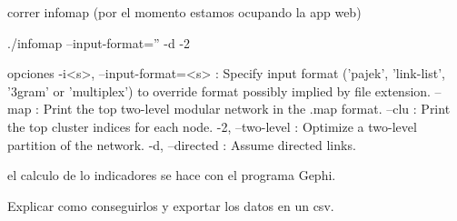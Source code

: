 \documentclass[12pt]{article}
\begin{document}
        
    correr infomap (por el momento estamos ocupando la app web)
    
    ./infomap --input-format='' -d -2
    
    opciones
    -i<s>, --input-format=<s> : Specify input format ('pajek', 'link-list', '3gram' or 'multiplex') to override format possibly implied by file extension.
    --map : Print the top two-level modular network in the .map format.
    --clu : Print the top cluster indices for each node.
    -2, --two-level : Optimize a two-level partition of the network.
    -d, --directed : Assume directed links.
    
    el calculo de lo indicadores se hace con el programa Gephi. 
    
    Explicar como conseguirlos y exportar los datos en un csv.
    
	
		
	
	
	
    
    
\end{document}
